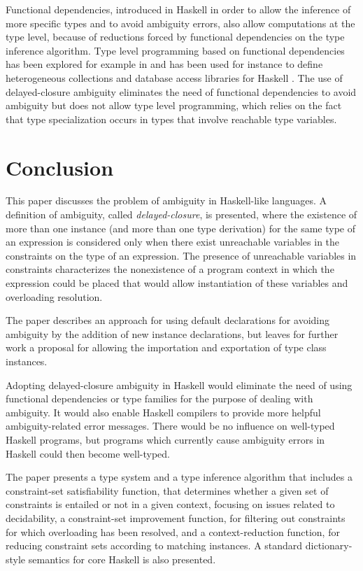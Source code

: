 \documentclass[review]{elsarticle}
\begin{document}
Functional dependencies, introduced in Haskell in order to allow the
inference of more specific types and to avoid ambiguity errors, also
allow computations at the type level, because of reductions forced by
functional dependencies on the type inference algorithm. Type level
programming based on functional dependencies has been explored for
example in \cite{hallgren01,McBride02} and has been used for instance
to define heterogeneous collections and database access libraries for
Haskell \cite{Kiselyov04,Silva06}. The use of delayed-closure
ambiguity eliminates the need of functional dependencies to avoid
ambiguity but does not allow type level programming, which relies on
the fact that type specialization occurs in types that involve
reachable type variables.



\section{Conclusion}
\label{Conclusion}

This paper discusses the problem of ambiguity in Haskell-like
languages. A definition of ambiguity, called {\em delayed-closure}, is
presented, where the existence of more than one instance (and more
than one type derivation) for the same type of an expression is
considered only when there exist unreachable variables in the
constraints on the type of an expression.  The presence of unreachable
variables in constraints characterizes the nonexistence of a program
context in which the expression could be placed that would allow
instantiation of these variables and overloading resolution.

The paper describes an approach for using default declarations for
avoiding ambiguity by the addition of new instance declarations, but
leaves for further work a proposal for allowing the importation and
exportation of type class instances.

Adopting delayed-closure ambiguity in Haskell would eliminate the need
of using functional dependencies or type families for the purpose of
dealing with ambiguity. It would also enable Haskell compilers to
provide more helpful ambiguity-related error messages. There would be
no influence on well-typed Haskell programs, but programs which
currently cause ambiguity errors in Haskell could then become
well-typed.

The paper presents a type system and a type inference algorithm that
includes a constraint-set satisfiability function, that determines
whether a given set of constraints is entailed or not in a given
context, focusing on issues related to decidability, a constraint-set
improvement function, for filtering out constraints for which
overloading has been resolved, and a context-reduction function, for
reducing constraint sets according to matching instances. A standard
dictionary-style semantics for core Haskell is also presented.
\end{document}
